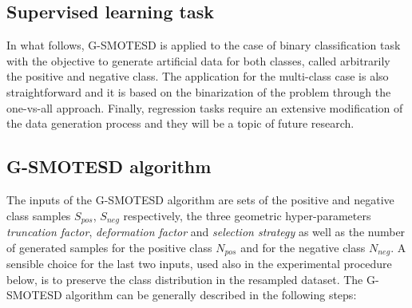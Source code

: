 \documentclass[parskip=full]{scrartcl}
\begin{document}
\subsection{Supervised learning task}

In what follows, G-SMOTESD is applied to the case of binary classification task with the objective to generate artificial data for both classes, called
arbitrarily the positive and negative class. The application for the multi-class case is also straightforward and it is based on the binarization of the problem through the one-vs-all approach. Finally, regression tasks require an extensive modification of the data generation process and they will be a topic of future research.

\subsection{G-SMOTESD algorithm}
\label{algorithm}

The inputs of the G-SMOTESD algorithm are sets of the positive and negative class samples \( S_{pos} \), \( S_{neg} \) respectively, the three geometric hyper-parameters \textit{truncation factor}, \textit{deformation factor} and \textit{selection strategy} as well as the number of generated samples for the positive class \(N_{pos} \) and for the negative class \( N_{neg} \). A sensible choice for the last two inputs, used also in the experimental procedure below, is to preserve the class distribution in the resampled dataset. The G-SMOTESD algorithm can be generally described in the following steps:
\end{document}
